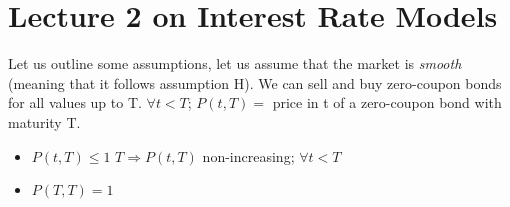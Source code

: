 \section{Lecture 2 on Interest Rate Models}
Let us outline some assumptions, let us assume that the market is \textit{smooth} (meaning that it follows assumption
H). 
We can sell and buy zero-coupon bonds for all values up to T. 
$\forall t \lt T$; $P(t,T) = $ price in t of a zero-coupon bond with maturity T. 
\begin{rem}
 \begin{itemize}
  \item $P(t,T) \leq 1$ $T \Rightarrow P(t,T)$ non-increasing; $\forall t \lt T$
\item $P(T,T) = 1$
 \end{itemize}

\end{rem}

